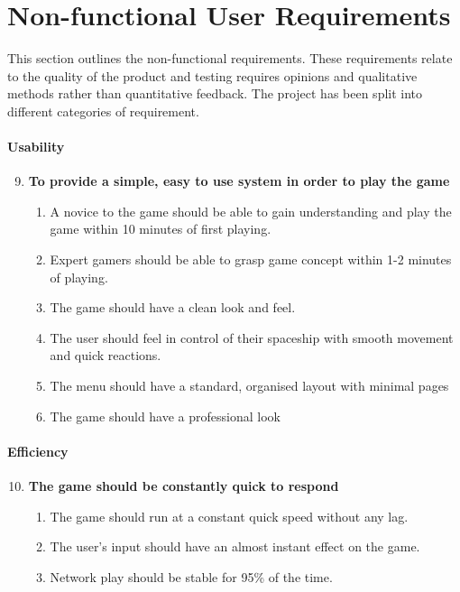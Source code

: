 \section{Non-functional User Requirements}
\label{sec: non-functional}

This section outlines the non-functional requirements. These requirements relate to the quality of the product and testing requires opinions and qualitative methods rather than quantitative feedback. The project has been split into different categories of requirement.

\paragraph{Usability} 
\begin{enumerate}
\setcounter{enumi}{8}
\item \textbf{To provide a simple, easy to use system in order to play the game}
\begin{enumerate}
\item A novice to the game should be able to gain understanding and play the game within 10 minutes of first playing.
\item Expert gamers should be able to grasp game concept within 1-2 minutes of playing.
\item The game should have a clean look and feel.
\item The user should feel in control of their spaceship with smooth movement and quick reactions.
\item The menu should have a standard, organised layout with minimal pages
\item The game should have a professional look
\end{enumerate}
\end{enumerate}

\paragraph{Efficiency}
\begin{enumerate}
\setcounter{enumi}{9}
\item \textbf{The game should be constantly quick to respond}
\begin{enumerate}
\item The game should run at a constant quick speed without any lag.
\item The user's input should have an almost instant effect on the game.
\item Network play should be stable for 95\% of the time.
\end{enumerate}
\end{enumerate}

